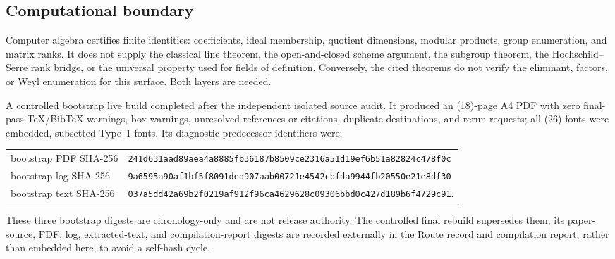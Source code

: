 \subsection{Computational boundary}

Computer algebra certifies finite identities: coefficients, ideal
membership, quotient dimensions, modular products, group enumeration, and
matrix ranks.  It does not supply the classical line theorem, the
open-and-closed scheme argument, the subgroup theorem, the
Hochschild--Serre rank bridge, or the universal property used for fields of
definition.  Conversely, the cited theorems do not verify the eliminant,
factors, or Weyl enumeration for this surface.  Both layers are needed.

A controlled bootstrap live build completed after the independent isolated
source audit.  It produced an (18)-page A4 PDF with zero final-pass
TeX/BibTeX warnings, box warnings, unresolved references or citations,
duplicate destinations, and rerun requests; all (26) fonts were embedded,
subsetted Type~1 fonts.  Its diagnostic predecessor identifiers were:
\begin{center}
\scriptsize
\begin{tabular}{@{}>{\raggedright\arraybackslash}p{}>{\raggedright\arraybackslash}p{}@{}}
bootstrap PDF SHA-256
& \texttt{241d631aad89aea4a8885fb36187b8509ce2316a51d19ef6b51a82824c478f0c}\\
bootstrap log SHA-256
& \texttt{9a6595a90af1bf5f8091ded907aab00721e4542cbfda9944fb20550e21e8df30}\\
bootstrap text SHA-256
& \texttt{037a5dd42a69b2f0219af912f96ca4629628c09306bbd0c427d189b6f4729c91}.
\end{tabular}
\end{center}
These three bootstrap digests are chronology-only and are not release
authority.  The controlled final rebuild supersedes them; its paper-source,
PDF, log, extracted-text, and compilation-report digests are recorded
externally in the Route record and compilation report, rather than embedded
here, to avoid a self-hash cycle.
